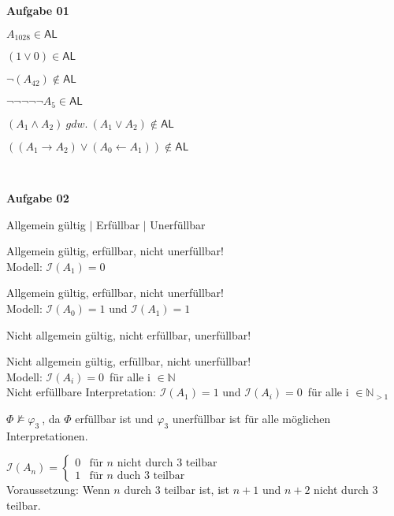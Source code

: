 \documentclass[a4paper,10pt]{article}
\begin{document}
	\parindent0pt
	\textbf{Aufgabe 01}
	\begin{compactenum}[(i)]
		\item $ A_{1028} \in \mathsf{AL} $
		\item $ (1 \vee 0) \in \mathsf{AL}$
		\item $ \lnot(A_{42})\notin \mathsf{AL}$
		\item $ \lnot\lnot\lnot\lnot\lnot A_5 \in \mathsf{AL}$
		\item $ (A_1 \wedge A_2)\ gdw.\ (A_1 \vee A_2)\notin \mathsf{AL}$
		\item $ ((A_1 \to A_2) \vee (A_0 \leftarrow A_1))\notin \mathsf{AL}$
	\end{compactenum}\

	\textbf{Aufgabe 02}
	\begin{compactenum}[(a)]
		\item Allgemein gültig $\mid$ Erfüllbar $\mid$ Unerfüllbar
		\begin{compactenum}[(i)]
			\item Allgemein gültig, erfüllbar, nicht unerfüllbar!\\
			Modell: $\mathcal{I}(A_1)=0 $
			\item Allgemein gültig, erfüllbar, nicht unerfüllbar!\\
			Modell: $\mathcal{I}(A_0)=1 $ und $\mathcal{I}(A_1)=1 $ \\
			\item Nicht allgemein gültig, nicht erfüllbar, unerfüllbar!
			\item Nicht allgemein gültig, erfüllbar, nicht unerfüllbar!\\
			Modell: $\mathcal{I}(A_i)=0 $\ für alle i $\in \mathbb{N} $\\
			Nicht erfüllbare Interpretation: $\mathcal{I}(A_1)=1$ und $\mathcal{I}(A_i)=0 $\ für alle i $\in \mathbb{N}_{>1}$
		\end{compactenum}
		\item $\Phi \nvDash \varphi_3\ $, da $\Phi$ erfüllbar ist und $\varphi_3$ unerfüllbar ist für alle möglichen Interpretationen.
		\item $ \mathcal{I}(A_n)=
		\begin{cases}
		0 & \text{für $n$ nicht durch 3 teilbar}\\
		1 & \text{für $n$ duch 3 teilbar}
		\end{cases}
		$ \\ Voraussetzung: Wenn $n$ durch 3 teilbar ist, ist $n+1$ und $n+2$ nicht durch 3 teilbar.
		\begin{itemize}

\end{itemize}
\end{compactenum}
\end{document}
